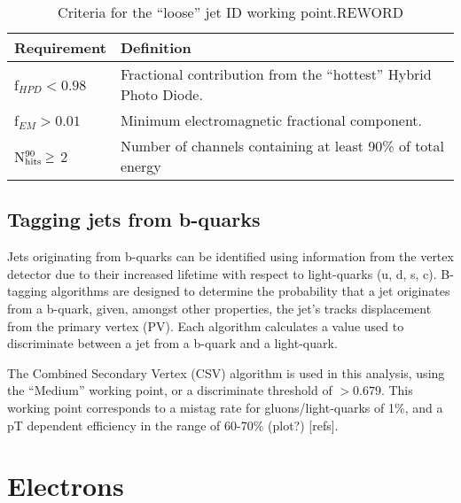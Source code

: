 \begin{table}[!ht]
  \caption{Criteria for the ``loose'' jet ID working point.\label{tab:jet_id_loose}REWORD}
  \footnotesize
  \begin{center}
    \begin{tabular}{ll}
      \hline
      \hline
      Requirement                & Definition                                                       \\
      \hline
      f$_{HPD} < 0.98$           & Fractional contribution from the ``hottest'' Hybrid Photo Diode. \\
      f$_{EM} > 0.01$            & Minimum electromagnetic fractional component.                    \\
      N$^{90}_{\rm hits} \geq$ 2 & Number of channels containing at least 90\% of total energy      \\
      \hline
      \hline
    \end{tabular}
  \end{center}
\end{table}


\subsection{Tagging jets from b-quarks}

Jets originating from b-quarks can be identified using information from the 
vertex detector due to their increased lifetime with respect to light-quarks (u,
d, s, c). 
B-tagging algorithms are designed to determine the probability that a jet 
originates from a b-quark, given, amongst other properties, the jet's tracks
displacement from the primary 
vertex (PV). Each algorithm
calculates a value used to discriminate between a jet from a b-quark and a
light-quark.

The Combined Secondary Vertex (CSV) algorithm is used in this analysis,
using the ``Medium'' working point, or a discriminate threshold of $>0.679$. This 
working point corresponds to a mistag rate for gluons/light-quarks of 1\%, and a
pT dependent efficiency in the range of 60-70\% (plot?) [refs].

\section{Electrons}  %
\label{sec:objects_electrons}



